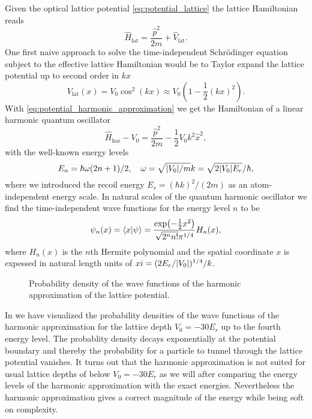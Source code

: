 Given the optical lattice potential \cref{eq:potential_lattice} the
lattice Hamiltonian reads
\begin{equation}
  \hat{H}_\text{lat}
  =\frac{\hat{p}^2}{2m}+\hat{V}_\text{lat}
  \label{eq:hamiltonian_lattice}.
\end{equation}
One first naive approach to solve the time-independent Schrödinger equation
subject to the effective lattice Hamiltonian would be to Taylor expand
the lattice potential up to second order in $kx$
\begin{equation}
  V_\text{lat}(x)
  =V_0\cos^2(kx)
  \approx V_0\left(1-\frac{1}{2}(kx)^2\right)
  \label{eq:potential_harmonic_approximation}.
\end{equation}
With \cref{eq:potential_harmonic_approximation} we get the Hamiltonian of a
linear harmonic quantum oscillator
\begin{equation}
  \hat{H}_\text{har}-V_0
  =\frac{\hat{p}^2}{2m}-\frac{1}{2}V_0k^2\hat{x}^2
  \label{eq:hamiltonian_harmonic_approximation},
\end{equation}
with the well-known energy levels
\begin{equation}
  E_n=\hbar\omega(2n+1)/2
  \qc
  \omega=\sqrt{\abs{V_0}/m}k=\sqrt{2\abs{V_0}E_r}/\hbar
  \label{eq:energy_harmonic_approximation},
\end{equation}
where we introduced the recoil energy $E_r=(\hbar k)^2/(2m)$ as an
atom-independent energy scale. In natural scales of the quantum harmonic
oscillator we find the time-independent wave functions for the energy level
$n$ to be
\begin{equation}
  \psi_n(x)
  =
  \bra{x}\ket{\psi}
  =
  \frac{\exp(-\frac{1}{2}x^2)}{\sqrt{2^nn!}\pi^{1/4}}H_n(x)
  \label{eq:wavefunction_harmonic},
\end{equation}
where $H_n(x)$ is the $n$th Hermite polynomial and the spatial coordinate $x$
is expessed in natural length units of $xi=(2E_r/\abs{V_0})^{1/4}/k$.
\begin{figure}[htb]
  \centering
  \begin{adjustbox}{width=\textwidth}
    
  \end{adjustbox}
  \caption{Probability density of the wave functions of the harmonic
    approximation of the lattice potential.
  }\label{fig:scale_harmonic}
\end{figure}
In  we have visualized the probability densities of
the wave functions of the harmonic approximation for the lattice depth
$V_0=-30E_r$ up to the fourth energy level. The probablity density decays
exponentially at the potential boundary and thereby the probability for a
particle to tunnel through the lattice potential vanishes. It turns out that
the harmonic approximation is not suited for usual lattice depths of below
$V_0=-30E_r$ as we will after comparing the energy levels of the harmonic
approximation with the exact energies. Nevertheless the harmonic approximation
gives a correct magnitude of the energy while being soft on complexity.

